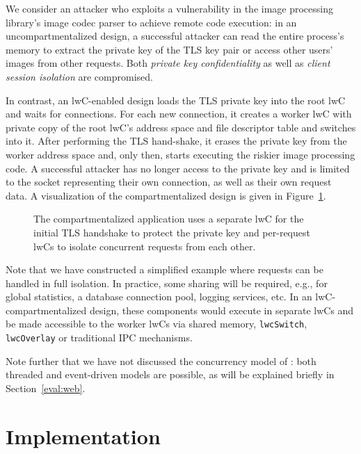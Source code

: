 \documentclass[10pt,twocolumn,a4paper]{article}
\begin{document}
We consider an attacker who exploits a vulnerability in the image processing library's image codec parser to achieve remote code execution:
in an uncompartmentalized design, a successful attacker can read the entire process's memory to extract the private key of the TLS key pair or access other users' images from other requests.
Both \textit{private key confidentiality} as well as \textit{client session isolation} are compromised.

In contrast, an lwC-enabled design loads the TLS private key into the root lwC and waits for connections.
For each new connection, it creates a worker lwC with private copy of the root lwC's address space and file descriptor table and switches into it.
After performing the TLS hand-shake, it erases the private key from the worker address space and, only then, starts executing the riskier image processing code.
A successful attacker has no longer access to the private key and is limited to the socket representing their own connection, as well as their own request data.
A visualization of the compartmentalized design is given in Figure~\ref{design:usage:apparchpost}.

\begin{figure}
  \centering
  \caption{
    The compartmentalized \appname application uses a separate lwC for the initial TLS handshake to protect the private key and per-request lwCs to isolate concurrent requests from each other.
    \label{design:usage:apparchpost}
  }
\end{figure}

Note that we have constructed a simplified example where requests can be handled in full isolation.
In practice, some sharing will be required, e.g., for global statistics, a database connection pool, logging services, etc.
In an lwC-compartmentalized design, these components would execute in separate lwCs and be made accessible to the worker lwCs via shared memory, \lstinline{lwcSwitch}, \lstinline{lwcOverlay} or traditional IPC mechanisms.

Note further that we have not discussed the concurrency model of \appname:
both threaded and event-driven models are possible, as will be explained briefly in Section~\ref{eval:web}.


\section{Implementation}\label{impl}
\end{document}
